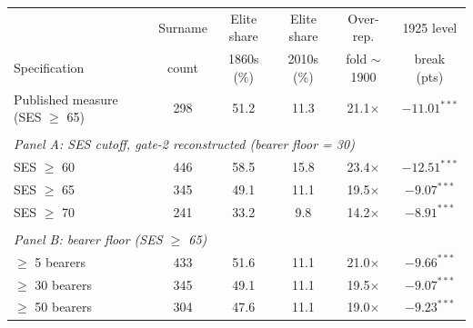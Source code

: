 \begin{tabular}{lccccc}
\toprule
 & Surname & Elite share & Elite share & Over-rep. & 1925 level \\
Specification & count & 1860s (\%) & 2010s (\%) & fold $\sim$1900 & break (pts) \\
\midrule
Published measure (SES $\geq$ 65) & 298 & 51.2 & 11.3 & 21.1$\times$ & $-11.01^{***}$ \\
\\[0.3em]
\multicolumn{6}{l}{\textit{Panel A: SES cutoff, gate-2 reconstructed (bearer floor = 30)}} \\
SES $\geq$ 60 & 446 & 58.5 & 15.8 & 23.4$\times$ & $-12.51^{***}$ \\
SES $\geq$ 65 & 345 & 49.1 & 11.1 & 19.5$\times$ & $-9.07^{***}$ \\
SES $\geq$ 70 & 241 & 33.2 & 9.8 & 14.2$\times$ & $-8.91^{***}$ \\
\\[0.3em]
\multicolumn{6}{l}{\textit{Panel B: bearer floor (SES $\geq$ 65)}} \\
$\geq$ 5 bearers & 433 & 51.6 & 11.1 & 21.0$\times$ & $-9.66^{***}$ \\
$\geq$ 30 bearers & 345 & 49.1 & 11.1 & 19.5$\times$ & $-9.07^{***}$ \\
$\geq$ 50 bearers & 304 & 47.6 & 11.1 & 19.0$\times$ & $-9.23^{***}$ \\
\bottomrule
\end{tabular}
